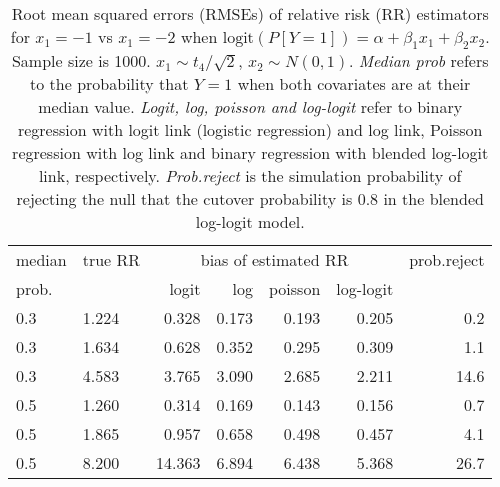 \documentclass[12pt,a4paper]{article}
\begin{document}
\begin{table}[H] 
\small\sf\centering 
\caption{Root mean squared errors (RMSEs) of relative risk (RR) estimators for $x_1=-1$ vs $x_1=-2$ when $\mbox{logit}(P[Y=1])=\alpha+\beta_1 x_1 + \beta_2 x_2$. Sample size is 1000. $x_1 \sim $$t_4/\sqrt{2}$, $x_2 \sim N(0,1)$. {\it Median prob} refers to the probability that $Y=1$ when both covariates are at their median value. {\it Logit, log, poisson and log-logit} refer to binary regression with logit link (logistic regression) and log link, Poisson regression with log link and binary regression with blended log-logit link, respectively. {\it Prob.reject} is the simulation probability of rejecting the null that the cutover probability is $0.8$ in the blended log-logit model.} 
\begin{tabular}{llrrrrr} 
\toprule 
median & true RR & \multicolumn{4}{c}{bias of estimated RR} & prob.reject \\ 
prob. & & logit & log & poisson & log-logit  & \\ \midrule 
0.3 & 1.224 &  0.328 & 0.173 & 0.193 & 0.205 &  0.2 \\  
0.3 & 1.634 &  0.628 & 0.352 & 0.295 & 0.309 &  1.1 \\  
0.3 & 4.583 &  3.765 & 3.090 & 2.685 & 2.211 & 14.6 \\  
0.5 & 1.260 &  0.314 & 0.169 & 0.143 & 0.156 &  0.7 \\  
0.5 & 1.865 &  0.957 & 0.658 & 0.498 & 0.457 &  4.1 \\  
0.5 & 8.200 & 14.363 & 6.894 & 6.438 & 5.368 & 26.7 \\  
\bottomrule 
\end{tabular} 
\end{table} 
\end{document}
